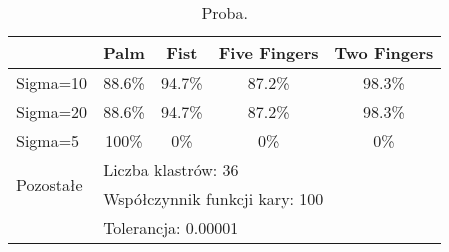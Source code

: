 \begin{table}
	\centering
	\begin{tabular}{|l|c|c|c|c|}
		\hline
		& \textbf{Palm} & \textbf{Fist} & \textbf{Five Fingers} & \textbf{Two Fingers} \\ \hline
		Sigma=10 	& 88.6\% 		& 94.7\%		& 87.2\%				& 98.3\% \\ \hline
		Sigma=20  	& 88.6\% 		& 94.7\%		& 87.2\%				& 98.3\% \\ \hline
		Sigma=5 		& 100\%			& 0\%			& 0\%					& 0\% \\ \hline
		\multirow{2}{*}{Pozostałe} & \multicolumn{4}{|l|}{Liczba klastrów: 36} \\ 
		\multirow{2}{*}{parametry} & \multicolumn{4}{|l|}{Współczynnik funkcji kary: 100} \\ 
		& \multicolumn{4}{|l|}{Tolerancja: 0.00001} \\ \hline
	\end{tabular}
	\caption{Proba.}
\end{table}





